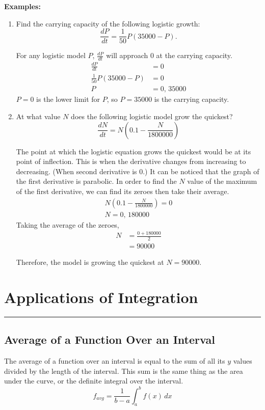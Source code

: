 \documentclass[12pt]{article}
\newcommand{\fline}{\par\noindent\rule{\textwidth}{0.1pt}} %
\begin{document}
\noindent \textbf{Examples:}
\begin{enumerate}
    \item Find the carrying capacity of the following logistic growth:
          \[ \frac{dP}{dt} = \frac{1}{50} P (35000 - P). \]

          For any logistic model $P$, $\frac{dP}{dt}$ will approach $0$ at the carrying capacity.
          \begin{align*}
              \frac{dP}{dt}              & = 0           \\[6pt]
              \frac{1}{50} P (35000 - P) & = 0           \\[6pt]
              P                          & = 0, \, 35000
          \end{align*}
          $P=0$ is the lower limit for $P$, so $P=35000$ is the carrying capacity.
          \bigskip

    \item At what value $N$ does the following logistic model grow the quickest?
          \[ \frac{dN}{dt} = N \left( 0.1 - \frac{N}{1800000} \right) \]

          The point at which the logistic equation grows the quickest would be at its point of inflection. This is when the derivative changes from increasing to decreasing. (When second derivative is $0$.) It can be noticed that the graph of the first derivative is parabolic. In order to find the $N$ value of the maximum of the first derivative, we can find its zeroes then take their average.
          \begin{gather*}
              N \left( 0.1 - \frac{N}{1800000} \right) = 0 \\[6pt]
              N = 0, \, 180000
          \end{gather*}
          Taking the average of the zeroes,
          \begin{align*}
              N & = \frac{0 + 180000}{2} \\[6pt]
                & = 90000
          \end{align*}

          Therefore, the model is growing the quickest at $N=90000$.
\end{enumerate}

\section{Applications of Integration}
\fline

\subsection{Average of a Function Over an Interval} %
The average of a function over an interval is equal to the sum of all its $y$ values divided by the length of the interval. This sum is the same thing as the area under the curve, or the definite integral over the interval.
\[ f_{avg} = \frac{1}{b-a} \int_{a}^{b} f(x) \, dx \]
\end{document}
